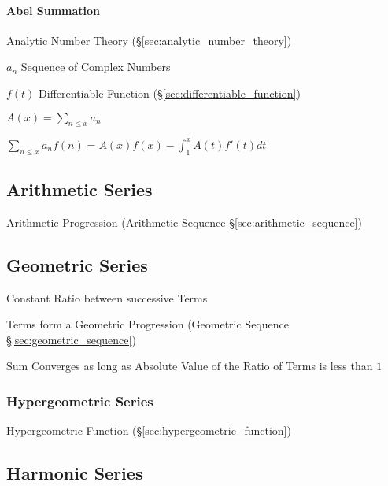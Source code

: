 \paragraph{Abel Summation}\label{sec:abel_summation}\hfill

Analytic Number Theory (\S\ref{sec:analytic_number_theory})

$a_n$ Sequence of Complex Numbers

$f(t)$ Differentiable Function (\S\ref{sec:differentiable_function})

$A(x) = \sum_{n \leq x} a_n$

$\sum_{n \leq x} a_n f(n) = A(x)f(x) - \int_1^x A(t)f'(t) dt$



\subsection{Arithmetic Series}\label{sec:arithmetic_series}

Arithmetic Progression (Arithmetic Sequence
\S\ref{sec:arithmetic_sequence})



\subsection{Geometric Series}\label{sec:geometric_series}

Constant Ratio between successive Terms

Terms form a Geometric Progression (Geometric Sequence
\S\ref{sec:geometric_sequence})

Sum Converges as long as Absolute Value of the Ratio of Terms is less
than $1$



\subsubsection{Hypergeometric Series}\label{sec:hypergeometric_series}

Hypergeometric Function (\S\ref{sec:hypergeometric_function})



\subsection{Harmonic Series}\label{sec:harmonic_series}


